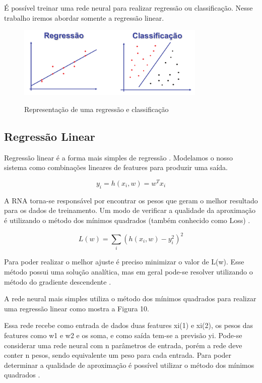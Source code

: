 É possível treinar uma rede neural para realizar regressão ou classificação. Nesse trabalho iremos abordar somente a regressão linear. 

\begin{figure}
    \caption{Representação de uma regressão e classificação}
    \centering
    \includegraphics[width=0.8\textwidth]{Textuais/Figuras/ai.pdf}
    \label{fig:reg-class}
\end{figure}

\subsection{Regressão Linear}

Regressão linear é a forma mais simples de regressão \cite{ai}. Modelamos o nosso sistema como combinações lineares de features para produzir uma saída.

\begin{equation}
    y_i = h(x_i,w) = w^Tx_i
\end{equation}

A RNA torna-se responsável por encontrar os pesos que geram o melhor resultado para os dados de treinamento. Um modo de verificar a qualidade da aproximação é utilizando o método dos mínimos quadrados (também conhecido como Loss) \cite{tf}.

\begin{equation}
    L(w) = \sum_i \left( h(x_i,w)-y_i^2 \right)^2
\end{equation}

Para poder realizar o melhor ajuste é preciso minimizar o valor de L(w). Esse método possui uma solução analítica, mas em geral pode-se resolver utilizando o método do gradiente descendente \cite{ai}.

A rede neural mais simples utiliza o método dos mínimos quadrados para realizar uma regressão linear como mostra a Figura 10. 

Essa rede recebe como entrada de dados duas features xi(1) e xi(2), os pesos das features como w1 e w2 e os soma, e como saída tem-se a previsão yi. Pode-se considerar uma rede neural com n parâmetros de entrada, porém a rede deve conter n pesos, sendo equivalente um peso para cada entrada. Para poder determinar a qualidade de aproximação é possível utilizar o método dos mínimos quadrados \cite{ML}.

